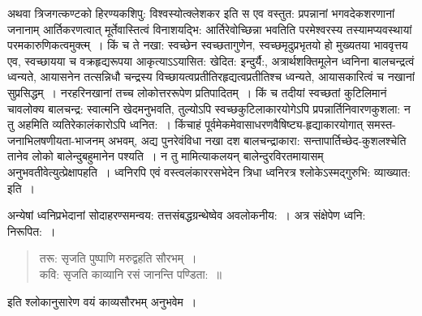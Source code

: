 {अथवा त्रिजगत्कण्टको हिरण्यकशिपु: विश्वस्योत्क्लेशकर इति स एव वस्तुत: प्रपन्नानां भगवदेकशरणानां जनानाम् आर्तिकरणत्वात् मूर्तेवास्तित्वं विनाशयद्भि: आर्तिरेवोच्छिन्ना भवतिति परमेश्वरस्य तस्यामप्यवस्थायां परमकारुणिकत्वमुक्त्म्~। किं च ते नखा: स्वच्छेन स्वच्छतागुणेन, स्वच्छमृदुप्रभृतयो हो मुख्यतया भाववृत्तय एव, स्वच्छायया च वक्रहृद्यरूपया आकृत्याऽऽयासित: खेदित: इन्दुर्यै:, अत्रार्थशक्तिमूलेन ध्वनिना बालचन्द्रत्वं ध्वन्यते, आयासनेन तत्सन्निधौ चन्द्रस्य विच्छायत्वप्रतीतिरहृद्यत्वप्रतीतिश्च ध्वन्यते, आयासकारित्वं च नखानां सुप्रसिद्धम्~। नरहरिनखानां तच्च लोकोत्तररूपेण प्रतिपादितम्~। किं च तदीयां स्वच्छतां कुटिलिमानं चावलोक्य बालचन्द्र: स्वात्मनि खेदमनुभवति, तुल्योऽपि स्वच्छकुटिलाकारयोगेऽपि प्रपन्नार्तिनिवारणकुशला: न तु अहमिति व्यतिरेकालंकारोऽपि ध्वनित:~। किंचाहं पूर्वमेकमेवासाधरणवैषिष्ट्य-हृद्याकारयोगात् समस्त-जनाभिलषणीयता-भाजनम् अभवम्, अद्य पुनरेवंविधा नखा दश बालचन्द्राकारा: सन्तापार्तिच्छेद-कुशलश्चेति तानेव लोको बालेन्दुबहुमानेन पश्यति~। न तु मामित्याकलयन् बालेन्दुरविरतमायासम् अनुभवतीवेत्युत्प्रेक्षापहति~। ध्वनिरपि एवं वस्त्वलंकाररसभेदेन त्रिधा ध्वनिरत्र श्लोकेऽस्मद्गुरुभि: व्याख्यात: इति~। 

अन्येषां ध्वनिप्रभेदानां सोदाहरण्समन्वय: तत्तसंबद्धग्रन्थेष्वेव अवलोकनीय:~। अत्र संक्षेपेण ध्वनि: निरूपित:~। 
\begin{verse}
तरू: सृजति पुष्पाणि मरुद्वहति सौरभम्~। \\
कवि: सृजति काव्यानि रसं जानन्ति पण्डिता:~॥
\end{verse}
इति श्लोकानुसारेण वयं काव्यसौरभम् अनुभवेम~। 

\articleend
}
